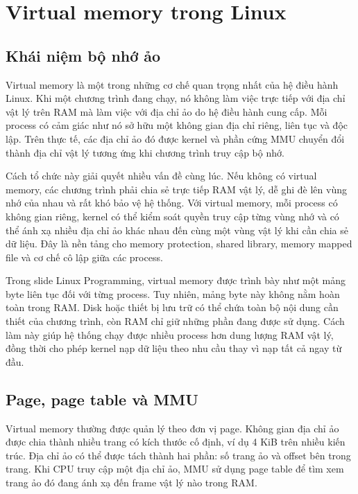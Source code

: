 \documentclass[11pt]{article}
\begin{document}
\section{Virtual memory trong Linux}

\subsection{Khái niệm bộ nhớ ảo}

Virtual memory là một trong những cơ chế quan trọng nhất của hệ điều hành Linux. Khi một chương trình đang chạy, nó không làm việc trực tiếp với địa chỉ vật lý trên RAM mà làm việc với địa chỉ ảo do hệ điều hành cung cấp. Mỗi process có cảm giác như nó sở hữu một không gian địa chỉ riêng, liên tục và độc lập. Trên thực tế, các địa chỉ ảo đó được kernel và phần cứng MMU chuyển đổi thành địa chỉ vật lý tương ứng khi chương trình truy cập bộ nhớ.

Cách tổ chức này giải quyết nhiều vấn đề cùng lúc. Nếu không có virtual memory, các chương trình phải chia sẻ trực tiếp RAM vật lý, dễ ghi đè lên vùng nhớ của nhau và rất khó bảo vệ hệ thống. Với virtual memory, mỗi process có không gian riêng, kernel có thể kiểm soát quyền truy cập từng vùng nhớ và có thể ánh xạ nhiều địa chỉ ảo khác nhau đến cùng một vùng vật lý khi cần chia sẻ dữ liệu. Đây là nền tảng cho memory protection, shared library, memory mapped file và cơ chế cô lập giữa các process.

Trong slide Linux Programming, virtual memory được trình bày như một mảng byte liên tục đối với từng process. Tuy nhiên, mảng byte này không nằm hoàn toàn trong RAM. Disk hoặc thiết bị lưu trữ có thể chứa toàn bộ nội dung cần thiết của chương trình, còn RAM chỉ giữ những phần đang được sử dụng. Cách làm này giúp hệ thống chạy được nhiều process hơn dung lượng RAM vật lý, đồng thời cho phép kernel nạp dữ liệu theo nhu cầu thay vì nạp tất cả ngay từ đầu.

\subsection{Page, page table và MMU}

Virtual memory thường được quản lý theo đơn vị page. Không gian địa chỉ ảo được chia thành nhiều trang có kích thước cố định, ví dụ 4 KiB trên nhiều kiến trúc. Địa chỉ ảo có thể được tách thành hai phần: số trang ảo và offset bên trong trang. Khi CPU truy cập một địa chỉ ảo, MMU sử dụng page table để tìm xem trang ảo đó đang ánh xạ đến frame vật lý nào trong RAM.
\end{document}
